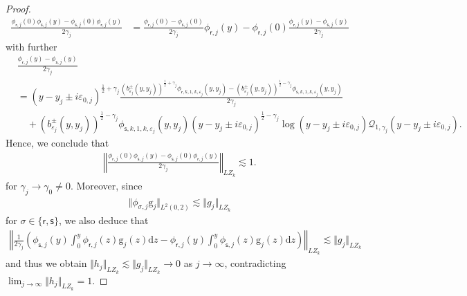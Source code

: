 \documentclass[11pt,reqno]{amsproc}
\theoremstyle{definition}
\numberwithin{equation}{section}
\newcommand{\Q}{{\mathcal{Q}}}
\newcommand{\sr}{{\mathsf{r}}}
\newcommand{\s}{{\mathsf{s}}}
\renewcommand{\d}{\mathrm{d}}
\newcommand{\ep}{\varepsilon}
\begin{document}
\begin{proof}
\begin{align*}
\frac{\phi_{\sr,j}(0)\phi_{\s,j}(y) - \phi_{\s,j}(0)\phi_{\sr,j}(y)}{2\gamma_j} &= \frac{\phi_{\sr,j}(0) - \phi_{\s,j}(0)}{2\gamma_j}\phi_{\sr,j}(y) - \phi_{\sr,j}(0) \frac{\phi_{\sr,j}(y) - \phi_{\s,j}(y)}{2\gamma_j} 
\end{align*}
with further 
\begin{align*}
&\frac{\phi_{\sr,j}(y) - \phi_{\s,j}(y)}{2\gamma_j}   \\
&= (y-y_j \pm i\ep_{0,j})^{\frac12+\gamma_j}\frac{(b_{\ep_j}^\pm(y,y_j))^{\frac12+\gamma_j} \phi_{\sr,k,1,k,\ep_j}(y,y_j) - (b_{\ep_j}^\pm(y,y_j))^{\frac12-\gamma_j} \phi_{\s,k,1,k,\ep_j}(y,y_j)}{2\gamma_j} \\
&\quad+ (b_{\ep_j}^\pm(y,y_j))^{\frac12-\gamma_j} \phi_{\s,k,1,k,\ep_j}(y,y_j)(y-y_j \pm i\ep_{0,j})^{\frac12-\gamma_j}\log (y-y_j \pm i\ep_{0,j})\Q_{1,\gamma_j}( y-y_j \pm i\ep_{0,j}).
\end{align*} 
Hence, we conclude that
\begin{align*}
\left \Vert \frac{\phi_{\sr,j}(0)\phi_{\s,j}(y) - \phi_{\s,j}(0)\phi_{\sr,j}(y)}{2\gamma_j} \right\Vert_{LZ_k} \lesssim 1.
\end{align*}
for $\gamma_j\rightarrow \gamma_0\neq 0$. Moreover, since
\begin{align*}
\Vert \phi_{\sigma,j} \mathrm{g}_j \Vert_{L^2(0,2)} \lesssim \Vert g_j \Vert_{LZ_k}
\end{align*}
for $\sigma\in \lbrace \sr, \s \rbrace$, we also deduce that
\begin{align*}
\left \Vert \frac{1}{2\gamma_j} \left( \phi_{\s,j}(y) \int_0^y \phi_{\sr,j}(z)\mathrm{g}_j(z) \d z - \phi_{\sr,j}(y) \int_0^y \phi_{\s,j}(z)\mathrm{g}_j(z) \d z \right) \right \Vert_{LZ_k} \lesssim \Vert g_j \Vert_{LZ_k}
\end{align*}
and thus we obtain $\Vert h_j \Vert_{LZ_k}\lesssim \Vert g_j \Vert_{LZ_k}\rightarrow 0$ as $j\rightarrow \infty$, contradicting $\lim_{j\rightarrow\infty} \Vert h_j \Vert_{LZ_k} =1$.


\end{proof}
\end{document}
